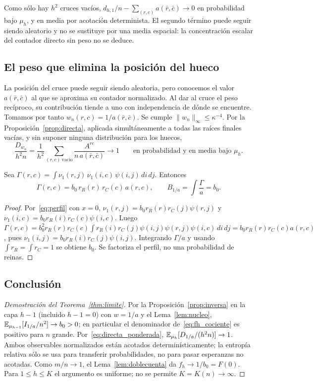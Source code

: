 Como sólo hay $h^2$ cruces vacíos,
$d_{h,1}/n-\sum_{(r,c)}a(\bar r,\bar c)\to0$ en probabilidad bajo $\mu_h$, y en media por
acotación determinista. El segundo término puede seguir siendo aleatorio y no se sustituye por
una media espacial: la concentración escalar del contador directo sin peso no se deduce.

\subsection{El peso que elimina la posición del hueco}

La posición del cruce puede seguir siendo aleatoria, pero conocemos el valor
$a(\bar r,\bar c)$ al que se aproxima su contador normalizado. Al dar al cruce el
peso recíproco, su contribución tiende a uno con independencia de dónde se
encuentre. Tomamos por tanto $w_n(r,c)=1/a(\bar r,\bar c)$. Se cumple
$\|w_n\|_\infty\le\kappa^{-4}$. Por la Proposición~\ref{prop:directa}, aplicada
simultáneamente a todas las raíces finales vacías, y sin suponer ninguna distribución para los
huecos,
\begin{equation}\label{eq:directa_ponderada}
 \frac{D_{w_n}}{h^2n}=\frac1{h^2}\sum_{(r,c)\ \text{vacío}}\frac{A^{rc}}{n\,a(\bar r,\bar c)}
 \longrightarrow1\qquad\text{en probabilidad y en media bajo }\mu_h .
\end{equation}

\begin{lema}\label{lem:nucleo}
Sea $\Gamma(r,c)=\int\nu_1(r,j)\,\nu_1(i,c)\,\psi(i,j)\,di\,dj$. Entonces
\[
 \Gamma(r,c)=b_0\,r_R(r)\,r_C(c)\,a(r,c),\qquad B_{1/a}=\int\frac\Gamma a=b_0 .
\]
\end{lema}

\begin{proof}
Por~\eqref{eq:perfil} con $x=0$, $\nu_1(r,j)=b_0r_R(r)r_C(j)\psi(r,j)$ y
$\nu_1(i,c)=b_0r_R(i)r_C(c)\psi(i,c)$. Luego
$\Gamma(r,c)=b_0^2r_R(r)r_C(c)\int r_R(i)r_C(j)\psi(i,j)\psi(r,j)\psi(i,c)\,di\,dj
=b_0r_R(r)r_C(c)a(r,c)$, pues $\nu_1(i,j)=b_0r_R(i)r_C(j)\psi(i,j)$. Integrando $\Gamma/a$ y usando
$\int r_R=\int r_C=1$ se obtiene $b_0$. Se factoriza el perfil, no una probabilidad de reinas.
\end{proof}

\subsection{Conclusión}

\begin{proof}[Demostración del Teorema~\ref{thm:limite}]
Por la Proposición~\ref{prop:inversa} en la capa $h-1$ (incluido $h-1=0$) con $w=1/a$ y el
Lema~\ref{lem:nucleo}, $\mathbb{E}_{\mu_{h-1}}[I_{1/a}/n^2]\to b_0>0$; en particular el denominador
de~\eqref{eq:fh_cociente} es positivo para $n$ grande. Por~\eqref{eq:directa_ponderada},
$\mathbb{E}_{\mu_h}[D_{1/a}/(h^2n)]\to1$. Ambos observables normalizados están acotados
determinísticamente; la entropía relativa sólo se usa para transferir probabilidades, no para
pasar esperanzas no acotadas. Como $m/n\to1$, el Lema~\ref{lem:doblecuenta} da
$f_h\to1/b_0=F(0)$. Para $1\le h\le K$ el argumento es uniforme; no se permite $K=K(n)\to\infty$.
\end{proof}

